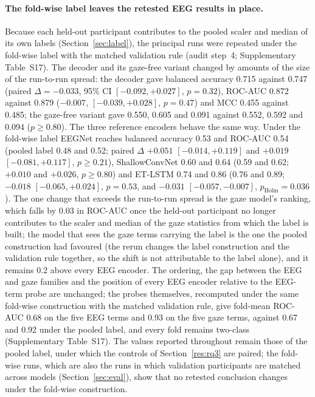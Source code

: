 \paragraph{The fold-wise label leaves the retested EEG results in place.} Because each held-out participant contributes to the pooled scaler and median of its own labels (Section~\ref{sec:label}), the principal runs were repeated under the fold-wise label with the matched validation rule (audit step~4; Supplementary Table~S17). The decoder and its gaze-free variant changed by amounts of the size of the run-to-run spread: the decoder gave balanced accuracy 0.715 against 0.747 (paired $\Delta=-0.033$, 95\% CI $[-0.092, +0.027]$, $p=0.32$), ROC-AUC 0.872 against 0.879 ($-0.007$, $[-0.039, +0.028]$, $p=0.47$) and MCC 0.455 against 0.485; the gaze-free variant gave 0.550, 0.605 and 0.091 against 0.552, 0.592 and 0.094 ($p\ge0.80$). The three reference encoders behave the same way. Under the fold-wise label EEGNet reaches balanced accuracy 0.53 and ROC-AUC 0.54 (pooled label 0.48 and 0.52; paired $\Delta$ $+0.051$ $[-0.014, +0.119]$ and $+0.019$ $[-0.081, +0.117]$, $p\ge0.21$), ShallowConvNet 0.60 and 0.64 (0.59 and 0.62; $+0.010$ and $+0.026$, $p\ge0.80$) and ET-LSTM 0.74 and 0.86 (0.76 and 0.89; $-0.018$ $[-0.065, +0.024]$, $p=0.53$, and $-0.031$ $[-0.057, -0.007]$, $p_{\mathrm{Holm}}=0.036$). The one change that exceeds the run-to-run spread is the gaze model's ranking, which falls by 0.03 in ROC-AUC once the held-out participant no longer contributes to the scaler and median of the gaze statistics from which the label is built; the model that sees the gaze terms carrying the label is the one the pooled construction had favoured (the rerun changes the label construction and the validation rule together, so the shift is not attributable to the label alone), and it remains 0.2 above every EEG encoder. The ordering, the gap between the EEG and gaze families and the position of every EEG encoder relative to the EEG-term probe are unchanged; the probes themselves, recomputed under the same fold-wise construction with the matched validation rule, give fold-mean ROC-AUC 0.68 on the five EEG terms and 0.93 on the five gaze terms, against 0.67 and 0.92 under the pooled label, and every fold remains two-class (Supplementary Table~S17). The values reported throughout remain those of the pooled label, under which the controls of Section~\ref{res:rq3} are paired; the fold-wise runs, which are also the runs in which validation participants are matched across models (Section~\ref{sec:eval}), show that no retested conclusion changes under the fold-wise construction.


